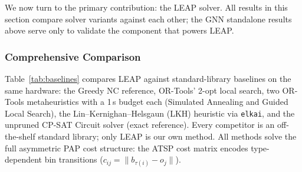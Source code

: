 \documentclass[review,times]{elsarticle}
\begin{document}
We now turn to the primary contribution: the LEAP solver. All results in this section compare solver variants against each other; the GNN standalone results above serve only to validate the component that powers LEAP.

\subsubsection{Comprehensive Comparison}\label{sec:baselines}

Table~\ref{tab:baselines} compares LEAP against standard-library baselines on the same hardware: the Greedy NC reference, OR-Tools' 2-opt local search, two OR-Tools metaheuristics with a 1\,s budget each (Simulated Annealing and Guided Local Search), the Lin--Kernighan--Helsgaun (LKH) heuristic via \texttt{elkai}, and the unpruned CP-SAT Circuit solver (exact reference). Every competitor is an off-the-shelf standard library; only LEAP is our own method. All methods solve the full asymmetric PAP cost structure: the ATSP cost matrix encodes type-dependent bin transitions ($c_{ij} = \lVert b_{\tau(i)} - o_j \rVert$).
\end{document}
